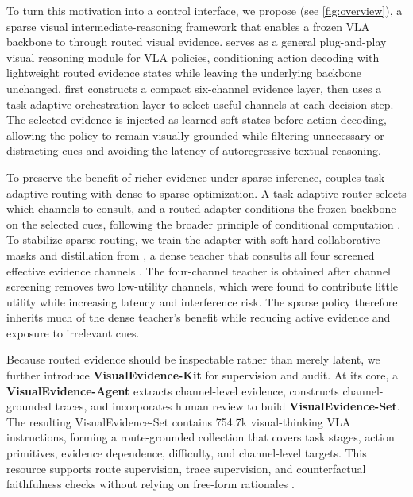To turn this motivation into a control interface, we propose \textbf{\method{}} (see \cref{fig:overview}), a sparse visual intermediate-reasoning framework that enables a frozen VLA backbone to \thinkimg{} through routed visual evidence. \method{} serves as a general plug-and-play visual reasoning module for VLA policies, conditioning action decoding with lightweight routed evidence states while leaving the underlying backbone unchanged.
\method{} first constructs a compact six-channel evidence layer, then uses a task-adaptive orchestration layer to select useful channels at each decision step.  The selected evidence is injected as learned soft states before action decoding, allowing the policy to remain visually grounded while filtering unnecessary or distracting cues and avoiding the latency of autoregressive textual reasoning.



To preserve the benefit of richer evidence under sparse inference, \method{} couples task-adaptive routing with dense-to-sparse optimization.
A task-adaptive router selects which channels to consult, and a routed adapter conditions the frozen backbone on the selected cues, following the broader principle of conditional computation \citep{shazeer2017moe,fedus2022switch}. To stabilize sparse routing, we train the adapter with soft-hard collaborative masks and distillation from \textbf{\fullsoft{}}, a dense teacher that consults all four screened effective evidence channels \citep{hinton2015distilling}. The four-channel teacher is obtained after channel screening removes two low-utility channels, which were found to contribute little utility while increasing latency and interference risk. The sparse policy therefore inherits much of the dense teacher's benefit while reducing active evidence and exposure to irrelevant cues.


Because routed evidence should be inspectable rather than merely latent, we further introduce \textbf{VisualEvidence-Kit} for supervision and audit. At its core, a \textbf{VisualEvidence-Agent} extracts channel-level evidence, constructs channel-grounded traces, and incorporates human review to build \textbf{VisualEvidence-Set}. 
The resulting VisualEvidence-Set contains 754.7k visual-thinking VLA instructions, forming a route-grounded collection that covers task stages, action primitives, evidence dependence, difficulty, and channel-level targets.
This resource supports route supervision, trace supervision, and counterfactual faithfulness checks without relying on free-form rationales \citep{deyoung2020eraser,jacovi2020towards}.


